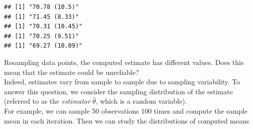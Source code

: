 \documentclass[
]{article}
\newenvironment{Shaded}{\begin{snugshade}}{\end{snugshade}}
\newcommand{\AttributeTok}[1]{\textcolor[rgb]{0.13,0.29,0.53}{#1}}
\newcommand{\ControlFlowTok}[1]{\textcolor[rgb]{0.13,0.29,0.53}{\textbf{#1}}}
\newcommand{\DecValTok}[1]{\textcolor[rgb]{0.00,0.00,0.81}{#1}}
\newcommand{\FunctionTok}[1]{\textcolor[rgb]{0.13,0.29,0.53}{\textbf{#1}}}
\newcommand{\NormalTok}[1]{#1}
\newcommand{\OtherTok}[1]{\textcolor[rgb]{0.56,0.35,0.01}{#1}}
\newcommand{\SpecialCharTok}[1]{\textcolor[rgb]{0.81,0.36,0.00}{\textbf{#1}}}
\newcommand{\StringTok}[1]{\textcolor[rgb]{0.31,0.60,0.02}{#1}}
\begin{document}
\begin{verbatim}
## [1] "70.78 (10.5)"
## [1] "71.45 (8.33)"
## [1] "70.31 (10.45)"
## [1] "70.25 (9.51)"
## [1] "69.27 (10.09)"
\end{verbatim}

Resampling data points, the computed estimate has different values. Does
this mean that the estimate could be unreliable?\\
Indeed, estimates vary from sample to sample due to sampling
variability. To answer this question, we consider the sampling
distribution of the estimate (referred to as the \textit{estimator}
\(\hat{\theta}\), which is a random variable).\\
For example, we can sample 50 observations 100 times and compute the
sample mean in each iteration. Then we can study the distributions of
computed means

\begin{Shaded}
\end{Shaded}
\end{document}
